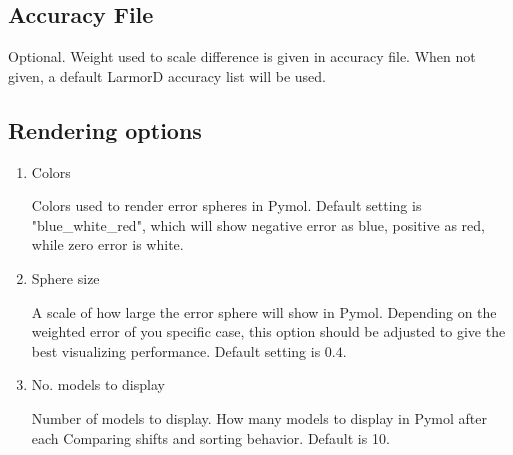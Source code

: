 \documentclass{article}
\begin{document}
\subsection{Accuracy File}
Optional. Weight used to scale difference is given in accuracy file. When not given, a default LarmorD accuracy list will be used. 
\subsection{Rendering options}
\begin{enumerate}
\item{Colors}

Colors used to render error spheres in Pymol. Default setting is "blue\_white\_red", which will show negative error as blue, positive as red, while zero error is white.
\item{Sphere size}

A scale of how large the error sphere will show in Pymol. Depending on the weighted error of you specific case, this option should be adjusted to give the best visualizing performance. Default setting is $0.4$.
\item{No. models to display}

Number of models to display. How many models to display in Pymol after each Comparing shifts and sorting behavior. Default is 10.
\end{enumerate}
\end{document}
